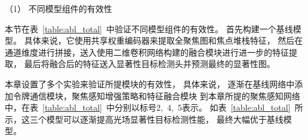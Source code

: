 

（1）
不同模型组件的有效性



本节在表~\ref{table:abl_total}~中验证不同模型组件的有效性。
首先构建一个基线模型。 
具体来说，它使用共享权重编码器来提取全聚焦图和焦点堆栈特征，
然后在通道维度进行拼接，送入使用二维卷积网络构建的融合模块进行进一步的特征提取，
最后将融合后的特征送入显著性目标检测头并预测最终的显著性图。 










本章设置了多个实验来验证所提模块的有效性，
具体来说，
逐渐在基线网络中添加令牌通信模块，聚焦感知增强策略和特征融合模块
到本章所提的聚焦感知网络中，在表~\ref{table:abl_total}~中分别以标号2,~4,~5表示。
如表~\ref{table:abl_total}~所示，这三个模型可以逐渐提高光场显著性目标检测性能，
最终大幅优于基线模型。 


